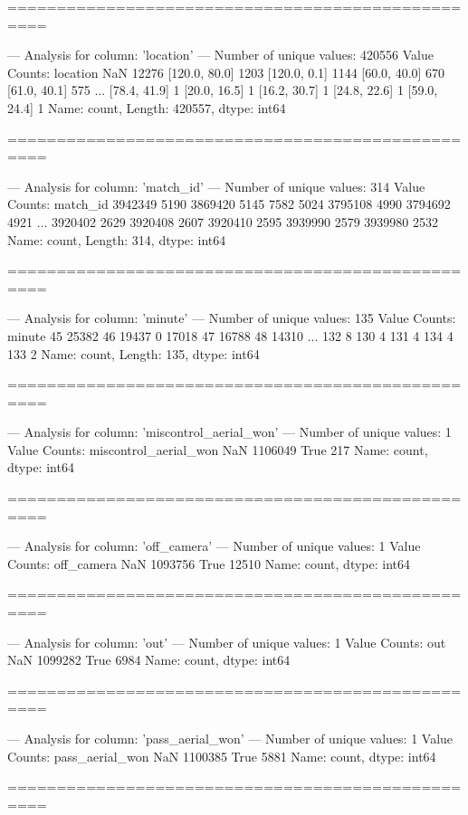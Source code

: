 ==================================================

--- Analysis for column: 'location' ---
Number of unique values: 420556
Value Counts:
location
NaN              12276
[120.0, 80.0]     1203
[120.0, 0.1]      1144
[60.0, 40.0]       670
[61.0, 40.1]       575
                 ...  
[78.4, 41.9]         1
[20.0, 16.5]         1
[16.2, 30.7]         1
[24.8, 22.6]         1
[59.0, 24.4]         1
Name: count, Length: 420557, dtype: int64

==================================================

--- Analysis for column: 'match_id' ---
Number of unique values: 314
Value Counts:
match_id
3942349    5190
3869420    5145
7582       5024
3795108    4990
3794692    4921
           ... 
3920402    2629
3920408    2607
3920410    2595
3939990    2579
3939980    2532
Name: count, Length: 314, dtype: int64

==================================================

--- Analysis for column: 'minute' ---
Number of unique values: 135
Value Counts:
minute
45     25382
46     19437
0      17018
47     16788
48     14310
       ...  
132        8
130        4
131        4
134        4
133        2
Name: count, Length: 135, dtype: int64

==================================================

--- Analysis for column: 'miscontrol_aerial_won' ---
Number of unique values: 1
Value Counts:
miscontrol_aerial_won
NaN     1106049
True        217
Name: count, dtype: int64

==================================================

--- Analysis for column: 'off_camera' ---
Number of unique values: 1
Value Counts:
off_camera
NaN     1093756
True      12510
Name: count, dtype: int64

==================================================

--- Analysis for column: 'out' ---
Number of unique values: 1
Value Counts:
out
NaN     1099282
True       6984
Name: count, dtype: int64

==================================================

--- Analysis for column: 'pass_aerial_won' ---
Number of unique values: 1
Value Counts:
pass_aerial_won
NaN     1100385
True       5881
Name: count, dtype: int64

==================================================

